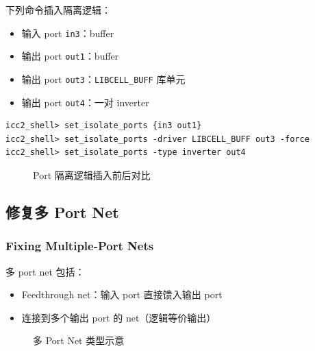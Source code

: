下列命令插入隔离逻辑：
\begin{itemize}
  \item 输入 port \texttt{in3}：buffer
  \item 输出 port \texttt{out1}：buffer
  \item 输出 port \texttt{out3}：\texttt{LIBCELL\_BUFF} 库单元
  \item 输出 port \texttt{out4}：一对 inverter
\end{itemize}
\begin{lstlisting}
icc2_shell> set_isolate_ports {in3 out1}
icc2_shell> set_isolate_ports -driver LIBCELL_BUFF out3 -force
icc2_shell> set_isolate_ports -type inverter out4
\end{lstlisting}

\begin{figure}[htbp]
\centering
{}
\caption{Port 隔离逻辑插入前后对比}
\label{fig:ch2b-port-isolation}
\end{figure}

\subsection{修复多 Port Net}
\subsubsection*{Fixing Multiple-Port Nets}

多 port net 包括：
\begin{itemize}
  \item Feedthrough net：输入 port 直接馈入输出 port
  \item 连接到多个输出 port 的 net（逻辑等价输出）
\end{itemize}

\begin{figure}[htbp]
\centering
{}
\caption{多 Port Net 类型示意}
\label{fig:ch2b-multiport-nets}
\end{figure}

